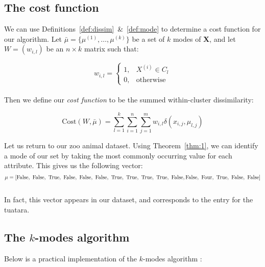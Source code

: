 \subsection{The cost function}\label{subsec:cost}

We can use Definitions~\ref{def:dissim}~\&~\ref{def:mode} to determine a cost 
function for our algorithm. Let \(\bar{\mu} = \{\mu^{(1)}, \ldots, \mu^{(k)}\}\) 
be a set of \(k\) modes of \textbf{X}, and let \(W = (w_{i,l})\) be an \(n 
\times k\) matrix such that:

\[ 
    w_{i,l} = \begin{cases}
                1, & X^{(i)} \in C_l \\
                0, & \text{otherwise}
              \end{cases}
\]\\

Then we define our \emph{cost function} to be the summed within-cluster 
dissimilarity:

\begin{equation}
    \text{Cost}(W, \bar{\mu}) = \sum_{l=1}^{k} \sum_{i=1}^{n} 
                                \sum_{j=1}^{m} w_{i,l} 
                                \delta(x_{i,j}, \mu_{l,j})
\end{equation}

\begin{example}\label{ex:cost}
    Let us return to our zoo animal dataset. Using Theorem~\ref{thm:1}, we can
    identify a mode of our set by taking the most commonly occurring value for 
    each attribute. This gives us the following vector:
    \[
        \mu = \left[\false, \ \false, \ \true, \ \false, \ \false, \ \false, \
        \true, \ \true, \ \true, \ \true, \ \false, \false, \ \text{Four}, \ 
        \true, \ \false, \ \false\right]
    \]\\

    In fact, this vector appears in our dataset, and corresponds to the entry 
    for the tuatara.

\end{example}

\subsection{The \(k\)-modes algorithm}\label{subsec:kmodes}

Below is a practical implementation of the \(k\)-modes algorithm \cite{Huang98}:

